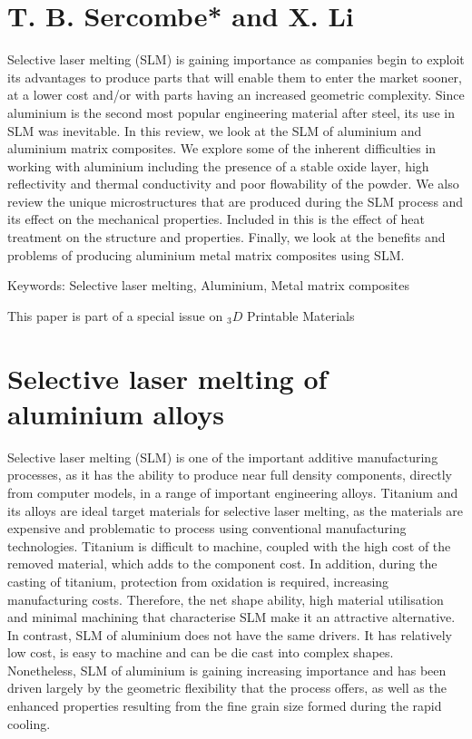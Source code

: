\documentclass[10pt]{article}
\begin{document}
\section*{T. B. Sercombe* and X. Li}
Selective laser melting (SLM) is gaining importance as companies begin to exploit its advantages to produce parts that will enable them to enter the market sooner, at a lower cost and/or with parts having an increased geometric complexity. Since aluminium is the second most popular engineering material after steel, its use in SLM was inevitable. In this review, we look at the SLM of aluminium and aluminium matrix composites. We explore some of the inherent difficulties in working with aluminium including the presence of a stable oxide layer, high reflectivity and thermal conductivity and poor flowability of the powder. We also review the unique microstructures that are produced during the SLM process and its effect on the mechanical properties. Included in this is the effect of heat treatment on the structure and properties. Finally, we look at the benefits and problems of producing aluminium metal matrix composites using SLM.

Keywords: Selective laser melting, Aluminium, Metal matrix composites

This paper is part of a special issue on ${ }_{3} D$ Printable Materials

\section*{Selective laser melting of aluminium alloys}
Selective laser melting (SLM) is one of the important additive manufacturing processes, as it has the ability to produce near full density components, directly from computer models, in a range of important engineering alloys. Titanium and its alloys are ideal target materials for selective laser melting, as the materials are expensive and problematic to process using conventional manufacturing technologies. Titanium is difficult to machine, coupled with the high cost of the removed material, which adds to the component cost. In addition, during the casting of titanium, protection from oxidation is required, increasing manufacturing costs. Therefore, the net shape ability, high material utilisation and minimal machining that characterise SLM make it an attractive alternative. In contrast, SLM of aluminium does not have the same drivers. It has relatively low cost, is easy to machine and can be die cast into complex shapes. Nonetheless, SLM of aluminium is gaining increasing importance and has been driven largely by the geometric flexibility that the process offers, as well as the enhanced properties resulting from the fine grain size formed during the rapid cooling.
\end{document}
